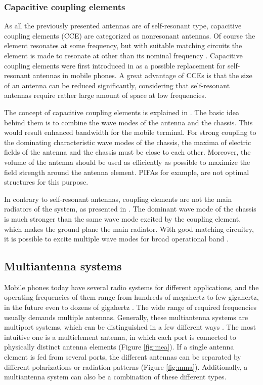 \subsubsection{Capacitive coupling elements}
\label{sec:cce}
As all the previously presented antennas are of self-resonant type, capacitive coupling elements (CCE) are categorized as nonresonant antennas. Of course the element resonates at some frequency, but with suitable matching circuits the element is made to resonate at other than its nominal frequency \cite{valkonen_cce}. Capacitive coupling elements were first introduced in \cite{vainikainen_resonator_analysis} as a possible replacement for self-resonant antennas in mobile phones. A great advantage of CCEs is that the size of an antenna can be reduced significantly, considering that self-resonant antennas require rather large amount of space at low frequencies. 

The concept of capacitive coupling elements is explained in \cite{vainikainen_resonator_analysis, villanen_cce}. The basic idea behind them is to combine the wave modes of the antenna and the chassis. This would result enhanced bandwidth for the mobile terminal. For strong coupling to the dominating characteristic wave modes of the chassis, the maxima of electric fields of the antenna and the chassis must be close to each other. Moreover, the volume of the antenna should be used as efficiently as possible to maximize the field strength around the antenna element. PIFAs for example, are not optimal structures for this purpose. 

In contrary to self-resonant antennas, coupling elements are not the main radiators of the system, as presented in \cite{villanen_cce}. The dominant wave mode of the chassis is much stronger than the same wave mode excited by the coupling element, which makes the ground plane the main radiator. With good matching circuitry, it is possible to excite multiple wave modes for broad operational band \cite{valkonen_cce}.


\subsection{Multiantenna systems}
\label{sec:multiant}
Mobile phones today have several radio systems for different applications, and the operating frequencies of them range from hundreds of megahertz to few gigahertz, in the future even to dozens of gigahertz \cite{20ant}. The wide range of required frequencies usually demands multiple antennas. Generally, these multiantenna systems are multiport systems, which can be distinguished in a few different ways \cite{multiantenna_mimo_book}. The most intuitive one is a multielement antenna, in which each port is connected to physically distinct antenna elements (Figure \ref{fig:mea}). If a single antenna element is fed from several ports, the different antennas can be separated by different polarizations or radiation patterns (Figure \ref{fig:mma}). Additionally, a multiantenna system can also be a combination of these different types.

